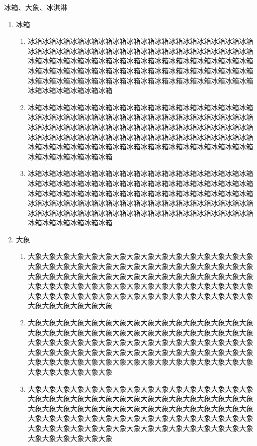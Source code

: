 \documentclass[11pt]{article}
\begin{document}
冰箱、大象、冰淇淋

\begin{enumerate}
    \item 冰箱
    \begin{enumerate}
        \item 冰箱冰箱冰箱冰箱冰箱冰箱冰箱冰箱冰箱冰箱冰箱冰箱冰箱冰箱冰箱冰箱冰箱冰箱冰箱冰箱冰箱冰箱冰箱冰箱冰箱冰箱冰箱冰箱冰箱冰箱冰箱冰箱冰箱冰箱冰箱冰箱冰箱冰箱冰箱冰箱冰箱冰箱冰箱冰箱冰箱冰箱冰箱冰箱冰箱冰箱冰箱冰箱冰箱冰箱冰箱冰箱冰箱冰箱冰箱冰箱冰箱冰箱冰箱冰箱冰箱冰箱冰箱冰箱冰箱冰箱冰箱冰箱冰箱冰箱冰箱冰箱冰箱冰箱冰箱冰箱冰箱冰箱冰箱冰箱冰箱冰箱
        \item 冰箱冰箱冰箱冰箱冰箱冰箱冰箱冰箱冰箱冰箱冰箱冰箱冰箱冰箱冰箱冰箱冰箱冰箱冰箱冰箱冰箱冰箱冰箱冰箱冰箱冰箱冰箱冰箱冰箱冰箱冰箱冰箱冰箱冰箱冰箱冰箱冰箱冰箱冰箱冰箱冰箱冰箱冰箱冰箱冰箱冰箱冰箱冰箱冰箱冰箱冰箱冰箱冰箱冰箱冰箱冰箱冰箱冰箱冰箱冰箱冰箱冰箱冰箱冰箱冰箱冰箱冰箱冰箱冰箱冰箱冰箱冰箱冰箱冰箱冰箱冰箱冰箱冰箱冰箱冰箱冰箱冰箱冰箱冰箱冰箱冰箱
        \item 冰箱冰箱冰箱冰箱冰箱冰箱冰箱冰箱冰箱冰箱冰箱冰箱冰箱冰箱冰箱冰箱冰箱冰箱冰箱冰箱冰箱冰箱冰箱冰箱冰箱冰箱冰箱冰箱冰箱冰箱冰箱冰箱冰箱冰箱冰箱冰箱冰箱冰箱冰箱冰箱冰箱冰箱冰箱冰箱冰箱冰箱冰箱冰箱冰箱冰箱冰箱冰箱冰箱冰箱冰箱冰箱冰箱冰箱冰箱冰箱冰箱冰箱冰箱冰箱冰箱冰箱冰箱冰箱冰箱冰箱冰箱冰箱冰箱冰箱冰箱冰箱冰箱冰箱冰箱冰箱冰箱冰箱冰箱冰箱冰箱冰箱
    \end{enumerate}
    \item 大象
    \begin{enumerate}
        \item 大象大象大象大象大象大象大象大象大象大象大象大象大象大象大象大象大象大象大象大象大象大象大象大象大象大象大象大象大象大象大象大象大象大象大象大象大象大象大象大象大象大象大象大象大象大象大象大象大象大象大象大象大象大象大象大象大象大象大象大象大象大象大象大象大象大象大象大象大象大象大象大象大象大象大象大象大象大象大象大象大象大象大象大象大象大象
        \item 大象大象大象大象大象大象大象大象大象大象大象大象大象大象大象大象大象大象大象大象大象大象大象大象大象大象大象大象大象大象大象大象大象大象大象大象大象大象大象大象大象大象大象大象大象大象大象大象大象大象大象大象大象大象大象大象大象大象大象大象大象大象大象大象大象大象大象大象大象大象大象大象大象大象大象大象大象大象大象大象大象大象大象大象大象大象
        \item 大象大象大象大象大象大象大象大象大象大象大象大象大象大象大象大象大象大象大象大象大象大象大象大象大象大象大象大象大象大象大象大象大象大象大象大象大象大象大象大象大象大象大象大象大象大象大象大象大象大象大象大象大象大象大象大象大象大象大象大象大象大象大象大象大象大象大象大象大象大象大象大象大象大象大象大象大象大象大象大象大象大象大象大象大象大象

\end{enumerate}
\end{enumerate}
\end{document}
